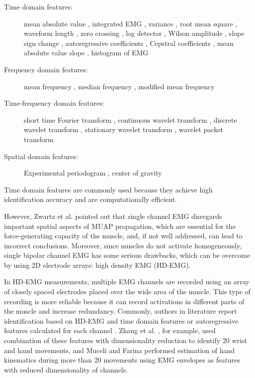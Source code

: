 \begin{description}
\item[Time domain features:] mean absolute value \citep{Hudgins1993}, integrated EMG \citep{Park1998}, variance \citep{Park1998, Zardoshti1995}, root mean square \citep{Farrell2008}, waveform length \citep{Hudgins1993}, zero crossing \citep{Hudgins1993}, log detector \citep{Tkach2010}, Wilson amplitude \citep{Zardoshti1995}, slope sign change \citep{Hudgins1993}, autoregressive coefficients \citep{Hargrove2007}, Cepstral coefficients \citep{Park1998}, mean absolute value slope \citep{Phinyomark2012}, histogram of EMG \citep{Phinyomark2012, Zardoshti1995}
\item[Frequency domain features:] mean frequency \citep{Phinyomark2012b}, median frequency \citep{Phinyomark2012b}, modified mean frequency \citep{Phinyomark2009}
\item[Time-frequency domain features:] short time Fourier transform \citep{Englehart2003b, Englehart2001}, continuous wavelet transform \citep{Englehart2003b, Englehart2001}, discrete wavelet transform \citep{Englehart2003b}, stationary wavelet transform \citep{Englehart2003b}, wavelet packet transform \citep{Englehart2003b, Englehart2001, Chu2006}
\item[Spatial domain features:] Experimental periodogram \citep{Stango2015}, center of gravity \citep{Rojas-Martinez2012, Rojas-Martinez2013}
\end{description}

Time domain features are commonly used \citep{Hakonen2015} because they achieve high identification accuracy and are computationally efficient.

However, Zwartz et al. \citep{Zwarts2003} pointed out that single channel EMG disregards important spatial aspects of MUAP propagation, which are essential for the force-generating capacity of the muscle, and, if not well addressed, can lead to incorrect conclusions. Moreover, since muscles do not activate homogeneously, single bipolar channel EMG has some serious drawbacks, which can be overcome by using 2D electrode arrays: high density EMG (HD-EMG). 

In HD-EMG measurements, multiple EMG channels are recorded using an array of closely spaced electrodes placed over the wide area of the muscle. This type of recording is more reliable because it can record activations in different parts of the muscle and increase redundancy. Commonly, authors in literature report identification based on HD-EMG and time domain features or autoregressive features calculated for each channel \citep{Hakonen2015}. Zhang et al. \citep{Zhang2012}, for example, used combination of these features with dimensionality reduction to identify 20 wrist and hand movements, and Muceli and Farina \citep{Muceli2012} performed estimation of hand kinematics during more than 20 movements using EMG envelopes as features with reduced dimensionality of channels.

